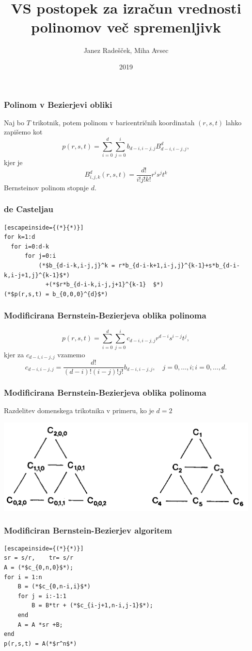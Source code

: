 \documentclass{beamer}
\title{VS postopek za izračun vrednosti polinomov več spremenljivk}
\author{Janez Radešček, Miha Avsec}
\institute{Fakulteta za matematiko in fiziko}
\date{2019}
\begin{document}
 
\frame{\titlepage}

\begin{frame}
\frametitle{Polinom v Bezierjevi obliki}
Naj bo $T$ trikotnik, potem polinom v baricentričnih koordinatah $(r,s,t)$ lahko zapišemo kot
$$p(r,s,t) = \sum_{i=0}^{d}\sum_{j=0}^{i}b_{d-i,i-j,j}B_{d-i,i-j,j}^{d},$$
kjer je
$$B_{i,j,k}^{d}(r,s,t) = \frac{d!}{i!j!k!}r^is^jt^k$$
Bernsteinov polinom stopnje $d$.

\end{frame}

\begin{frame}[fragile]
\frametitle{de Casteljau}
\begin{lstlisting}[escapeinside={(*}{*)}]
for k=1:d
  for i=0:d-k
      for j=0:i
          (*$b_{d-i-k,i-j,j}^k = r*b_{d-i-k+1,i-j,j}^{k-1}+s*b_{d-i-k,i-j+1,j}^{k-1}$*) 
          	+(*$r*b_{d-i-k,i-j,j+1}^{k-1}  $*)
(*$p(r,s,t) = b_{0,0,0}^{d}$*)
\end{lstlisting}


\end{frame}



\begin{frame}
\frametitle{Modificirana Bernstein-Bezierjeva oblika polinoma}
$$p(r,s,t) = \sum_{i=0}^{d}\sum_{j=0}^{i}c_{d-i,i-j,j}r^{d-i}s^{i-j}t^j,$$
kjer za $c_{d-i,i-j,j}$ vzamemo
$$c_{d-i,i-j,j} = \frac{d!}{(d-i)!(i-j)!j!}b_{d-i,i-j,j}, \quad j=0,\ldots, i; i = 0,\ldots,d.$$
\end{frame}


\begin{frame}
\frametitle{Modificirana Bernstein-Bezierjeva oblika polinoma}
Razdelitev domenskega trikotnika v primeru, ko je $d=2$
\begin{center}
\includegraphics[width=.9\linewidth]{graf.png}
\end{center}

\end{frame}

\begin{frame}[fragile]
\frametitle{Modificiran Bernstein-Bezierjev algoritem}
\begin{lstlisting}[escapeinside={(*}{*)}]
sr = s/r,	 tr= s/r
A = (*$c_{0,n,0}$*);
for i = 1:n
    B = (*$c_{0,n-i,i}$*)
    for j = i:-1:1
        B = B*tr + (*$c_{i-j+1,n-i,j-1}$*);
    end
    A = A *sr +B;
end
p(r,s,t) = A(*$r^n$*)
\end{lstlisting}



\end{frame}
\end{document}
